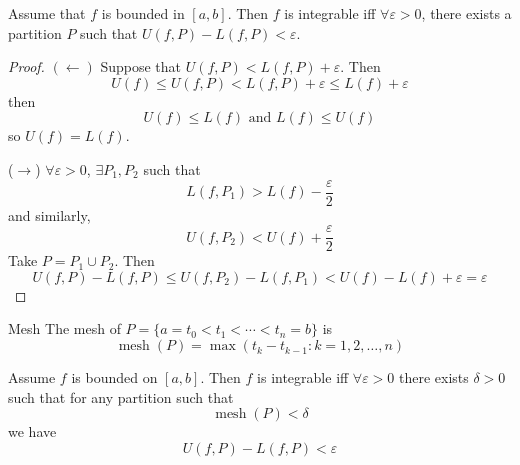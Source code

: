 \documentclass{report}
\begin{document}
\begin{theorem}{32.5}
    Assume that $f$ is bounded in $[a, b]$. Then $f$ is integrable iff $\forall \varepsilon > 0$, there exists a partition $P$ such that $U(f, P) - L(f, P) < \varepsilon$.
\end{theorem}
    \begin{proof}
        $(\leftarrow)$ Suppose that $U(f, P) < L(f, P) + \varepsilon$. Then 
            \begin{equation*}
                U(f) \leq U(f, P) < L(f, P) + \varepsilon \leq L(f) + \varepsilon
            \end{equation*}
        then 
            \begin{equation*}
                U(f) \leq L(f) \text{ and } L(f) \leq U(f)
            \end{equation*}
        so $U(f) = L(f)$.

        ($\rightarrow$) $\forall \varepsilon> 0$, $\exists P_{1}, P_{2}$ such that 
            \begin{equation*}
                L(f, P_{1}) > L(f) - \dfrac{\varepsilon}{ 2}
            \end{equation*}
        and similarly,
            \begin{equation*}
                U(f, P_{2}) < U(f) + \dfrac{\varepsilon}{ 2}
            \end{equation*}
        Take $P = P_{1} \cup P_{2}$. Then 
            \begin{equation*}
                U(f, P) - L(f, P) \leq U(f, P_{2}) - L(f, P_{1}) < U(f) - L(f) + \varepsilon = \varepsilon
            \end{equation*}
    \end{proof}

\begin{definition}{Mesh}
    The mesh of $P = \{a = t_{0} < t_{1} < \cdots < t_{n} = b\}$ is
        \begin{equation*}
            \mathop{mesh}(P) = \max(t_{k} - t_{k - 1} : k = 1, 2, \ldots, n)
        \end{equation*}
\end{definition}

\begin{theorem}{32.7}
    Assume $f$ is bounded on $[a, b]$. Then $f$ is integrable iff $\forall \varepsilon> 0$ there exists $\delta > 0$ such that for any partition such that 
        \begin{equation*}
            \mathop{mesh}(P) < \delta
        \end{equation*}
    we have
        \begin{equation*}
            U(f, P) - L(f, P) < \varepsilon
        \end{equation*}
\end{theorem} 
\end{document}
